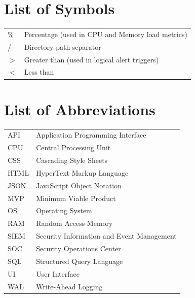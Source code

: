 \clearpage

\tableofcontents
\clearpage

\listoftables
{}
\clearpage

\listoffigures
{}
\clearpage

\chapter*{List of Symbols}
\begin{tabular}{ll}
\% & Percentage (used in CPU and Memory load metrics) \\
/ & Directory path separator \\
$>$ & Greater than (used in logical alert triggers) \\
$<$ & Less than \\
\end{tabular}

\clearpage

\chapter*{List of Abbreviations}
\begin{tabular}{ll}
API & Application Programming Interface \\
CPU & Central Processing Unit \\
CSS & Cascading Style Sheets \\
HTML & HyperText Markup Language \\
JSON & JavaScript Object Notation \\
MVP & Minimum Viable Product \\
OS & Operating System \\
RAM & Random Access Memory \\
SIEM & Security Information and Event Management \\
SOC & Security Operations Center \\
SQL & Structured Query Language \\
UI & User Interface \\
WAL & Write-Ahead Logging \\
\end{tabular}

\clearpage
